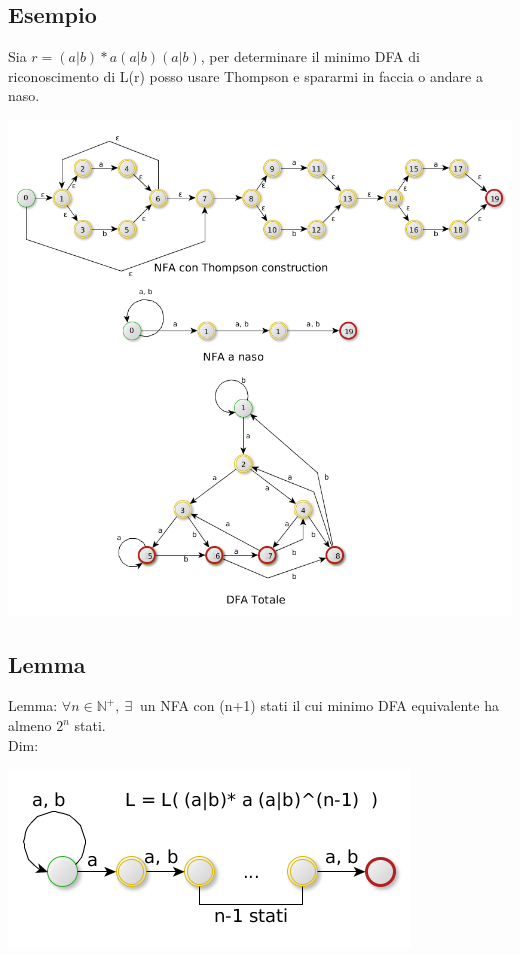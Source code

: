 \subsection{Esempio}
Sia $r=(a|b)*a(a|b)(a|b)$, per determinare il minimo DFA di riconoscimento di L(r) posso usare Thompson e spararmi in faccia o andare
a naso.

\begin{center}
	\includegraphics[scale=0.5]{Chapters/Img/c02_09.png}\\
\end{center} 

\subsection{Lemma}
Lemma: $\forall n \in \mathbb{N}^+,\ \exists\ $ un NFA con (n+1) stati il cui minimo DFA equivalente ha almeno $2^n$ stati.\\

Dim: 
\begin{center}
	\includegraphics[scale=0.5]{Chapters/Img/c02_10.png}\\
\end{center} 

